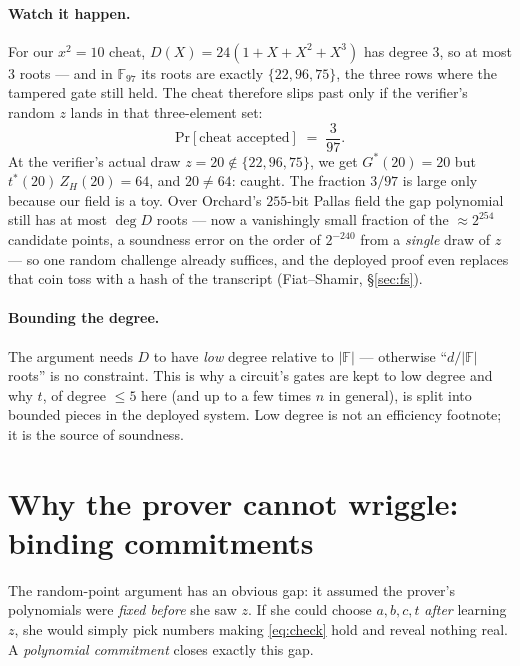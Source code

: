 \documentclass[11pt,a4paper]{article}
\theoremstyle{definition}
\newcommand{\F}{\mathbb{F}}
\renewcommand{\Pr}{\mathrm{Pr}}
\newcommand{\ZH}{Z_H}
\DeclareMathOperator{\degr}{deg}
\begin{document}
\paragraph{Watch it happen.} For our $x^2 = 10$ cheat, $D(X) = 24(1 + X + X^2
+ X^3)$ has degree $3$, so at most $3$ roots --- and in $\F_{97}$ its roots are
exactly $\{22, 96, 75\}$, the three rows where the tampered gate still held.
The cheat therefore slips past only if the verifier's random $z$ lands in that
three-element set:
\[
\Pr[\text{cheat accepted}] \;=\; \frac{3}{97}.
\]
At the verifier's actual draw $z = 20 \notin \{22,96,75\}$, we get
$G^{\!*}(20) = 20$ but $t^{\!*}(20)\,\ZH(20) = 64$, and $20 \neq 64$: caught.
The fraction $3/97$ is large only because our field is a toy. Over Orchard's
$255$-bit Pallas field the gap polynomial still has at most $\degr D$ roots ---
now a vanishingly small fraction of the $\approx 2^{254}$ candidate points, a
soundness error on the order of $2^{-240}$ from a \emph{single} draw of $z$ ---
so one random challenge already suffices, and the deployed proof even replaces
that coin toss with a hash of the transcript (Fiat--Shamir, \S\ref{sec:fs}).

\paragraph{Bounding the degree.} The argument needs $D$ to have \emph{low}
degree relative to $|\F|$ --- otherwise ``$d/|\F|$ roots'' is no constraint.
This is why a circuit's gates are kept to low degree and why $t$, of degree
$\le 5$ here (and up to a few times $n$ in general), is split into bounded
pieces in the deployed system. Low degree is not an efficiency footnote; it is
the source of soundness.

\section{Why the prover cannot wriggle: binding commitments}\label{sec:commit}

The random-point argument has an obvious gap: it assumed the prover's
polynomials were \emph{fixed before} she saw $z$. If she could choose
$a, b, c, t$ \emph{after} learning $z$, she would simply pick numbers making
\eqref{eq:check} hold and reveal nothing real. A \emph{polynomial commitment}
closes exactly this gap.
\end{document}
